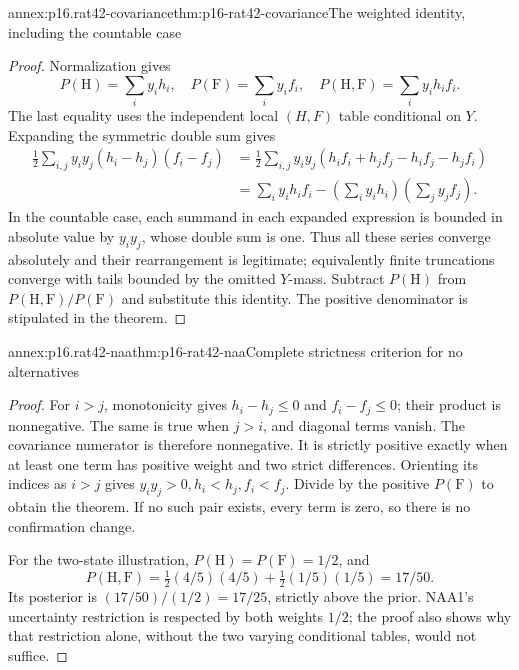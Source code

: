 \begin{annexitem}{annex:p16.rat42-covariance}{thm:p16-rat42-covariance}{The weighted identity, including the countable case}
\begin{proof}
Normalization gives
\[
 P(\mathrm H)=\sum_i y_i h_i,
 \quad P(\mathrm F)=\sum_i y_i f_i,
 \quad P(\mathrm H,\mathrm F)=\sum_i y_i h_i f_i.
\]
The last equality uses the independent local \((H,F)\) table
conditional on \(Y\). Expanding the symmetric double sum gives
\[
\begin{aligned}
 \tfrac12\sum_{i,j}y_i y_j(h_i-h_j)(f_i-f_j)
 &=\tfrac12\sum_{i,j}y_i y_j
   (h_if_i+h_jf_j-h_if_j-h_jf_i)\\
 &=\sum_i y_i h_i f_i
       -\left(\sum_i y_i h_i\right)
        \left(\sum_j y_j f_j\right).
\end{aligned}
\]
In the countable case, each summand in each expanded expression
is bounded in absolute value by \(y_i y_j\), whose double sum
is one. Thus all these series converge absolutely and their
rearrangement is legitimate; equivalently finite truncations
converge with tails bounded by the omitted \(Y\)-mass.
Subtract \(P(\mathrm H)\) from
\(P(\mathrm H,\mathrm F)/P(\mathrm F)\) and substitute this
identity. The positive denominator is stipulated in the theorem.
\end{proof}
\end{annexitem}

\begin{annexitem}{annex:p16.rat42-naa}{thm:p16-rat42-naa}{Complete strictness criterion for no alternatives}
\begin{proof}
For \(i>j\), monotonicity gives \(h_i-h_j\leq0\) and
\(f_i-f_j\leq0\); their product is nonnegative. The same is
true when \(j>i\), and diagonal terms vanish. The covariance
numerator is therefore nonnegative. It is strictly positive
exactly when at least one term has positive weight and two
strict differences. Orienting its indices as \(i>j\) gives
\(y_i y_j>0,h_i<h_j,f_i<f_j\). Divide by the positive
\(P(\mathrm F)\) to obtain the theorem. If no such pair exists,
every term is zero, so there is no confirmation change.

For the two-state illustration,
\(P(\mathrm H)=P(\mathrm F)=1/2\), and
\[
 P(\mathrm H,\mathrm F)
       =\tfrac12(4/5)(4/5)+\tfrac12(1/5)(1/5)
       =17/50.
\]
Its posterior is \((17/50)/(1/2)=17/25\), strictly above
the prior. NAA1's uncertainty restriction is respected
by both weights \(1/2\); the proof also shows why that
restriction alone, without the two varying conditional tables,
would not suffice.
\end{proof}
\end{annexitem}

